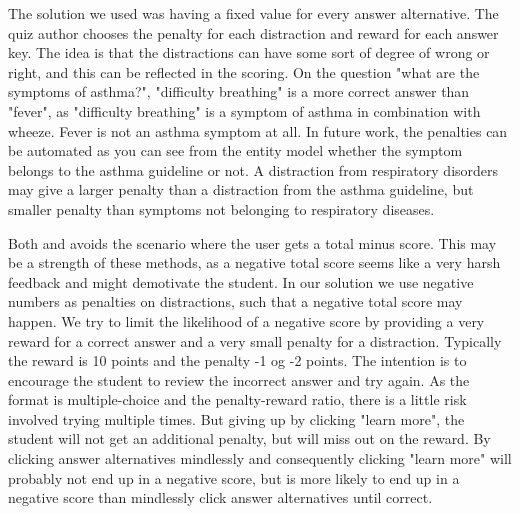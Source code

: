 The solution we used was having a fixed value for every answer alternative. The quiz author chooses the penalty for each distraction and reward for each answer key. The idea is that the distractions can have some sort of degree of wrong or right, and this can be reflected in the scoring. On the question "what are the symptoms of asthma?", "difficulty breathing" is a more correct answer than "fever", as "difficulty breathing" is a symptom of asthma in combination with wheeze. Fever is not an asthma symptom at all. In future work, the penalties can be automated as you can see from the entity model whether the symptom belongs to the asthma guideline or not. A distraction from respiratory disorders may give a larger penalty than a distraction from the asthma guideline, but smaller penalty than symptoms not belonging to respiratory diseases.

Both \textcite{Attali2015} and \textcite{Morrison1995} avoids the scenario where the user gets a total minus score. This may be a strength of these methods, as a negative total score seems like a very harsh feedback and might demotivate the student. In our solution we use negative numbers as penalties on distractions, such that a negative total score may happen. We try to limit the likelihood of a negative score by providing a very reward for a correct answer and a very small penalty for a distraction. Typically the reward is 10 points and the penalty -1 og -2 points. The intention is to encourage the student to review the incorrect answer and try again. As the format is multiple-choice and the penalty-reward ratio, there is a little risk involved trying multiple times. But giving up by clicking "learn more", the student will not get an additional penalty, but will miss out on the reward. By clicking answer alternatives mindlessly and consequently clicking "learn more" will probably not end up in a negative score, but is more likely to end up in a negative score than mindlessly click answer alternatives until correct.



